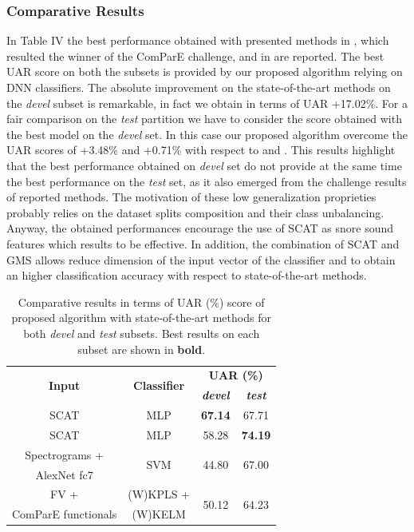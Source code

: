 \subsubsection{Comparative Results}
In Table IV the best performance obtained with presented methods in \cite{kaya2017introducing}, which resulted the winner of the ComParE challenge, and in \cite{amiriparian2017snore} are reported. The best UAR score on both the subsets is provided by our proposed algorithm relying on DNN classifiers. The absolute improvement on the state-of-the-art methods on the \textit{devel} subset is remarkable, in fact we obtain in terms of UAR +17.02\%. For a fair comparison on the \textit{test} partition we have to consider the score obtained with the best model on the \textit{devel} set. In this case our proposed algorithm overcome the UAR scores of +3.48\% and +0.71\% with respect to \cite{kaya2017introducing} and \cite{amiriparian2017snore}. This results highlight that the best performance obtained on \textit{devel} set do not provide at the same time the best performance on the \textit{test} set, as it also emerged from the challenge results of reported methods. The motivation of these low generalization proprieties probably relies on the dataset splits composition and their class unbalancing. 
Anyway, the obtained performances encourage the use of SCAT as snore sound features which results to be effective. In addition, the combination of SCAT and GMS allows reduce dimension of the input vector of the classifier and to obtain an higher classification accuracy with respect to state-of-the-art methods.

\begin{table}[ht]
	\centering
	\begin{tabular}{|c|c|c|c|}
		\hline
		\multirow{2}{*}{\textbf{Input}} \rule{0pt}{10pt} & \multirow{2}{*}{\textbf{Classifier}} & \multicolumn{2}{c|}{\textbf{UAR (\%)  }}\\
		\cline{3-4}
		&  & \textbf{\textit{devel}} & \textbf{\textit{test}} \\ 
		\hline
		SCAT \rule{0pt}{8pt} &  MLP   & \textbf{67.14} & 67.71 \\
		\hline
		SCAT \rule{0pt}{8pt} &  MLP   & 58.28 & \textbf{74.19} \\
		\hline
		Spectrograms + \rule{0pt}{8pt} & \multirow{2}{*}{SVM}	& \multirow{2}{*}{44.80} & \multirow{2}{*}{67.00} \\
		AlexNet fc7						&						&						&						   \\
		\hline
		FV + 	& (W)KPLS + & \multirow{2}{*}{50.12} & \multirow{2}{*}{64.23}  \\
		ComParE functionals &  (W)KELM  & 				&						\\
		\hline
	\end{tabular}
	\caption[VOTE Classification - Comparative Results]{Comparative results in terms of UAR (\%) score of proposed algorithm with state-of-the-art methods for both \textit{devel} and \textit{test} subsets. Best results on each subset are shown in \textbf{bold}.}
	\label{tab:results2}
\end{table}


